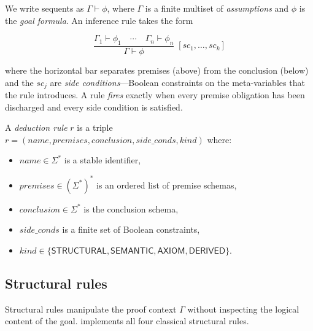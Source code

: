 \documentclass[11pt]{article}
\newcommand{\Prov}[2]{#1 \vdash #2}           %
\begin{document}
We write sequents as $\Prov{\Gamma}{\phi}$, where $\Gamma$ is a finite
multiset of \emph{assumptions} and $\phi$ is the \emph{goal formula}.  An
inference rule takes the form

\[
  \frac{\Prov{\Gamma_1}{\phi_1} \quad \cdots \quad \Prov{\Gamma_n}{\phi_n}}
       {\Prov{\Gamma}{\phi}}
  \;[\mathit{sc}_1, \ldots, \mathit{sc}_k]
\]

where the horizontal bar separates premises (above) from the conclusion
(below) and the $\mathit{sc}_j$ are \emph{side conditions}---Boolean
constraints on the meta-variables that the rule introduces.  A rule
\emph{fires} exactly when every premise obligation has been discharged
and every side condition is satisfied.

\begin{definition}\label{def:deduction-rule}
A \emph{deduction rule} $r$ is a triple
$r = (\mathit{name}, \mathit{premises}, \mathit{conclusion},
      \mathit{side\_conds}, \mathit{kind})$ where:
\begin{itemize}
  \item $\mathit{name} \in \Sigma^*$ is a stable identifier,
  \item $\mathit{premises} \in (\Sigma^*)^*$ is an ordered list of
        premise schemas,
  \item $\mathit{conclusion} \in \Sigma^*$ is the conclusion schema,
  \item $\mathit{side\_conds}$ is a finite set of Boolean constraints,
  \item $\mathit{kind} \in \{\mathsf{STRUCTURAL}, \mathsf{SEMANTIC},
        \mathsf{AXIOM}, \mathsf{DERIVED}\}$.
\end{itemize}
\end{definition}

\subsection{Structural rules}

Structural rules manipulate the proof context $\Gamma$ without
inspecting the logical content of the goal.  \JuGeo{} implements all
four classical structural rules.
\end{document}
